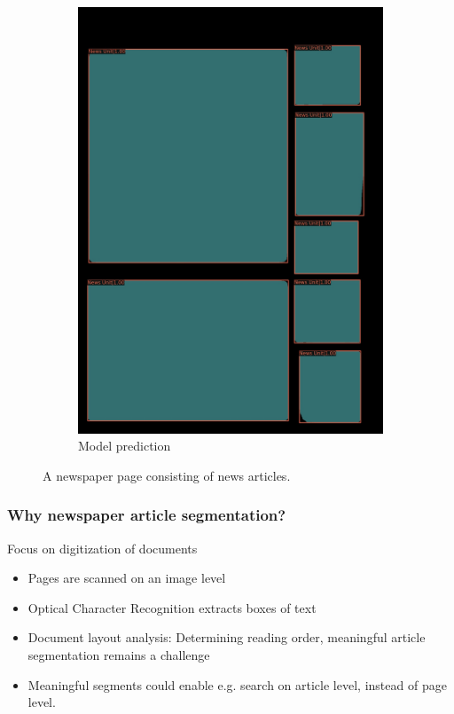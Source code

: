 \documentclass[aspectratio=1610]{beamer}
\begin{document}
\begin{frame}
\begin{figure}
\begin{subfigure}{.25\textwidth}
  \includegraphics[width=0.99\linewidth, clip=true, trim = 0mm 0mm 0mm 0mm]{figures/labels-vanilla-0.75/AVThDFz.jpg}
  \caption{Model prediction}
\end{subfigure}
\caption{A newspaper page consisting of news articles.}
\label{fig:newsarticles}
\end{figure}
\end{frame}
\normalpage

\normalpage
\begin{frame}
  \frametitle{Why newspaper article segmentation?}

  \begin{block}{Focus on digitization of documents}
    \begin{itemize}
    \item Pages are scanned on an image level
    \item Optical Character Recognition extracts boxes of text
    \item Document layout analysis: Determining reading order, meaningful article segmentation remains a challenge
    \item Meaningful segments could enable e.g. search on article level, instead of page level.
    \end{itemize}
  \end{block}

\end{frame}
\normalpage
\end{document}
